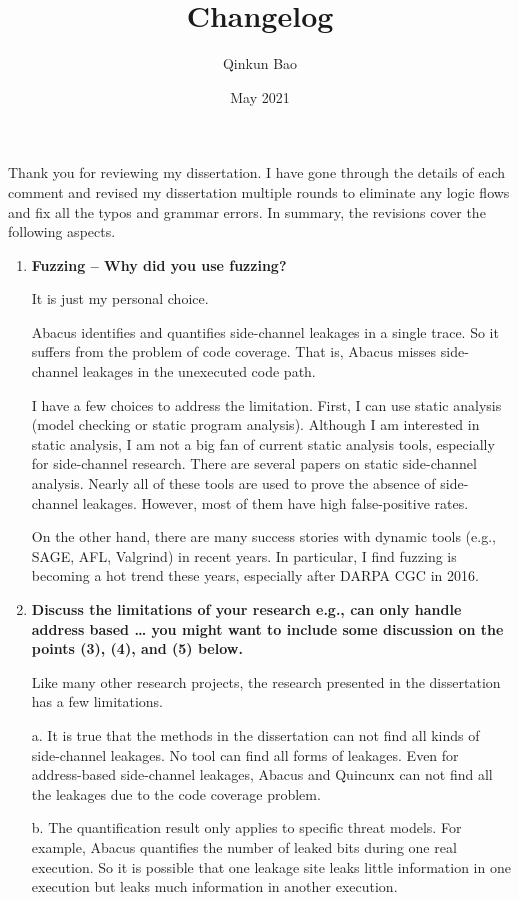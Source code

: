 \documentclass{article}
\title{Changelog}
\author{Qinkun Bao}
\date{May 2021}
\begin{document}
\maketitle
Thank you for reviewing my dissertation. I have gone through the details of each comment and revised my dissertation multiple rounds to eliminate any logic flows and fix all the typos and grammar errors. In summary, the revisions cover the following aspects.


\begin{enumerate}
\item \textbf{Fuzzing – Why did you use fuzzing?}

It is just my personal choice.

Abacus identifies and quantifies side-channel leakages in a single trace. So it suffers from the problem of code coverage.  That is, Abacus misses side-channel leakages in the unexecuted code path. 

I have a few choices to address the limitation. First, I can use static analysis (model checking or static program analysis). Although I am interested in static analysis, I am not a big fan of current static analysis tools, especially for side-channel research. There are several papers on static side-channel analysis. Nearly all of these tools are used to prove the absence of side-channel leakages. However, most of them have high false-positive rates. 

On the other hand, there are many success stories with dynamic tools (e.g., SAGE, AFL, Valgrind) in recent years. In particular, I find fuzzing is becoming a hot trend these years, especially after DARPA CGC in 2016.

\item \textbf{Discuss the limitations of your research
e.g., can only handle address based …
you might want to include some discussion on the points (3), (4), and (5) below.}

Like many other research projects, the research presented in the dissertation has a few limitations.

a. It is true that the methods in the dissertation can not find all kinds of side-channel leakages. No tool can find all forms of leakages. Even for address-based side-channel leakages, Abacus and Quincunx can not find all the leakages due to the code coverage problem. 

b. The quantification result only applies to specific threat models. For example, Abacus quantifies the number of leaked bits during one real execution. So it is possible that one leakage site leaks little information in one execution but leaks much information in another execution.


\end{enumerate}
\end{document}
